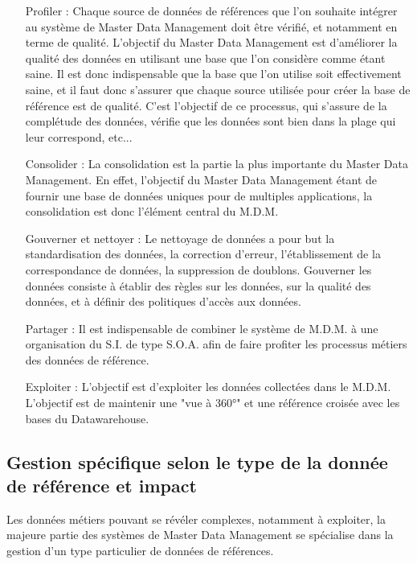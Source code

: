 \begin{itemize}

\item[Profiler : ]
Chaque source de données de références que l'on souhaite intégrer au système de Master Data Management doit être vérifié, et notamment en terme de qualité. L'objectif du Master Data Management est d'améliorer la qualité des données en utilisant une base que l'on considère comme étant saine. Il est donc indispensable que la base que l'on utilise soit effectivement saine, et il faut donc s'assurer que chaque source utilisée pour créer la base de référence est de qualité. C'est l'objectif de ce processus, qui s'assure de la complétude des données, vérifie que les données sont bien dans la plage qui leur correspond, etc...

\item[Consolider : ]
La consolidation est la partie la plus importante du Master Data Management. En effet, l'objectif du Master Data Management étant de fournir une base de données uniques pour de multiples applications, la consolidation est donc l'élément central du M.D.M.

\item[Gouverner et nettoyer : ]
Le nettoyage de données a pour but la standardisation des données, la correction d'erreur, l'établissement de la correspondance de données, la suppression de doublons. Gouverner les données consiste à établir des règles sur les données, sur la qualité des données, et à définir des politiques d'accès aux données.

\item[Partager : ]
Il est indispensable de combiner le système de M.D.M. à une organisation du S.I. de type S.O.A. afin de faire profiter les processus métiers des données de référence.

\item[Exploiter : ]
L'objectif est d'exploiter les données collectées dans le M.D.M. L'objectif est de maintenir une "vue à 360°" et une référence croisée avec les bases du Datawarehouse.


\end{itemize}

\subsection{Gestion spécifique selon le type de la donnée de référence et impact}

Les données métiers pouvant se révéler complexes, notamment à exploiter, la majeure partie des systèmes de Master Data Management se spécialise dans la gestion d'un type particulier de données de références.

